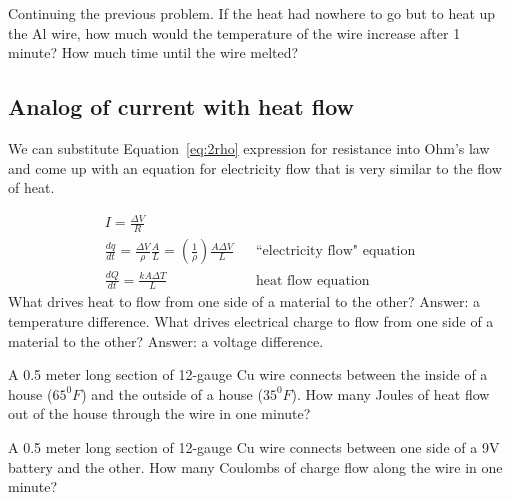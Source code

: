 \begin{dlevel}
Continuing the previous problem. If the heat had nowhere to go but to heat up the Al wire, how much would the temperature of the wire increase after 1 minute? How much time until the wire melted?
\end{dlevel}

\subsection{Analog of current with heat flow}
We can substitute Equation~\eqref{eq:2rho} expression for resistance into Ohm's law and come up with an equation for electricity flow that is very similar to the flow of heat.

\begin{align*}
I = \frac{\Delta V}{R}	\\
\frac{dq}{dt} = \frac{\Delta V}{\rho}\frac{A}{L}=(\frac{1}{\rho})\frac{A\Delta V}{L}&&	\text{``electricity flow" equation}\\
\frac{dQ}{dt}=	\frac{kA\Delta T}{L}&&				\text{heat flow equation}
\end{align*}
What drives heat to flow from one side of a material to the other? Answer: a temperature difference. What drives electrical charge to flow from one side of a material to the other? Answer: a voltage difference.

\begin{blevel}
A 0.5 meter long section of 12-gauge Cu wire connects between the inside of a house ($65^0 F$) and the outside of a house ($35^0 F$). How many Joules of heat flow out of the house through the wire in one minute?
\end{blevel}

\begin{blevel}
A 0.5 meter long section of 12-gauge Cu wire connects between one side of a 9V battery and the other. How many Coulombs of charge flow along the wire in one minute?
\end{blevel}



